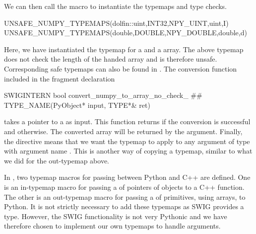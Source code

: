 We can then call the macro to instantiate the typemaps and type checks.
\begin{swigcode}
UNSAFE_NUMPY_TYPEMAPS(dolfin::uint,INT32,NPY_UINT,uint,I)
UNSAFE_NUMPY_TYPEMAPS(double,DOUBLE,NPY_DOUBLE,double,d)
\end{swigcode}
Here, we have instantiated the typemap for a  and a
 array. The above typemap does not check the length of the
handed \numpy array and is therefore unsafe. Corresponding safe
typemaps can also be found in . The conversion
function included in the fragment declaration
\begin{swigcode}
SWIGINTERN bool convert_numpy_to_array_no_check_ ## TYPE_NAME(PyObject* input, TYPE*& ret)
\end{swigcode}
takes a pointer to a  as input. This function returns
 if the conversion is successful and  otherwise. The
converted array will be returned by the  argument.
Finally, the  directive means that
we want the typemap to apply to any argument of type  with
argument name . This is another way of copying a typemap,
similar to what we did for the  out-typemap above.

In , two typemap macros for passing
 between Python and C++ are defined. One is
an in-typemap macro for passing a  of pointers of \dolfin
objects to a C++ function. The other is an out-typemap macro for passing
a  of primitives, using \numpy arrays, to Python. It
is not strictly necessary to add these typemaps as SWIG provides a
 type. However, the SWIG  functionality
is not very Pythonic and we have therefore chosen to implement our own
typemaps to handle  arguments.

